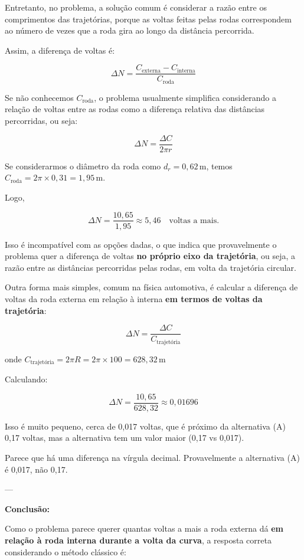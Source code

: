 \begin{flushleft}
Entretanto, no problema, a solução comum é considerar a razão entre os comprimentos das trajetórias, porque as voltas feitas pelas rodas correspondem ao número de vezes que a roda gira ao longo da distância percorrida.

Assim, a diferença de voltas é:

\[
\Delta N = \frac{C_{\text{externa}} - C_{\text{interna}}}{C_{\text{roda}}}
\]

Se não conhecemos $C_{\text{roda}}$, o problema usualmente simplifica considerando a relação de voltas entre as rodas como a diferença relativa das distâncias percorridas, ou seja:

\[
\Delta N = \frac{\Delta C}{2 \pi r}
\]

Se considerarmos o diâmetro da roda como $d_r = 0,62\,\text{m}$, temos $C_{\text{roda}} = 2 \pi \times 0,31 = 1,95\,\text{m}$.

Logo,

\[
\Delta N = \frac{10,65}{1,95} \approx 5,46 \quad \text{voltas a mais.}
\]

Isso é incompatível com as opções dadas, o que indica que provavelmente o problema quer a diferença de voltas \textbf{no próprio eixo da trajetória}, ou seja, a razão entre as distâncias percorridas pelas rodas, em volta da trajetória circular.

Outra forma mais simples, comum na física automotiva, é calcular a diferença de voltas da roda externa em relação à interna \textbf{em termos de voltas da trajetória}:

\[
\Delta N = \frac{\Delta C}{C_{\text{trajetória}}}
\]

onde $C_{\text{trajetória}} = 2 \pi R = 2 \pi \times 100 = 628,32\,\text{m}$

Calculando:

\[
\Delta N = \frac{10,65}{628,32} \approx 0,01696
\]

Isso é muito pequeno, cerca de 0,017 voltas, que é próximo da alternativa (A) 0,17 voltas, mas a alternativa tem um valor maior (0,17 vs 0,017).

Parece que há uma diferença na vírgula decimal. Provavelmente a alternativa (A) é 0,017, não 0,17.

---

\textbf{Conclusão:}

Como o problema parece querer quantas voltas a mais a roda externa dá \textbf{em relação à roda interna durante a volta da curva}, a resposta correta considerando o método clássico é:


\end{flushleft}
